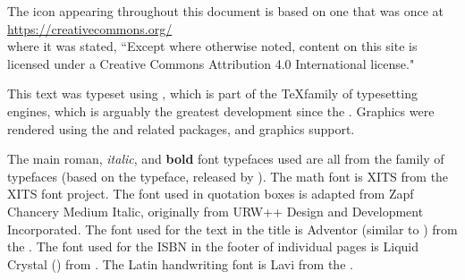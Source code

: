 The icon 
appearing throughout this document is based on one that was once at 
\\\indentx\url{https://creativecommons.org/}\\
where it was stated, 
``Except where otherwise noted, content on this site is licensed under a Creative Commons Attribution 4.0 International license."
\vfill
{\sffamily
This text was typeset using \hi{\XeLaTeX},
which is part of the \TeX family of typesetting engines, 
which is arguably the greatest development since the .
Graphics were rendered using the  and related packages, and \hi{\LaTeX} graphics support.

The main {\rmfamily roman}, {\itshape italic}, and {\bfseries bold} font typefaces used 
are all from the  family of typefaces
(based on the  typeface, released by ).
The math font is {{\fntXits XITS}} from the {{\fntXits XITS font project}}.
The font used in quotation boxes is adapted from {\fntZapf Zapf Chancery Medium Italic},
originally from URW++ Design and Development Incorporated.
The font used for the text in the title is {\fntAdventor Adventor} (similar to ) from the .
The font used for the ISBN in the footer of individual pages is 
\mbox{\fntDigital\footnotesize Liquid} \mbox{\fntDigital\footnotesize Crystal} 
() from .
The Latin handwriting font is {\fntLavi Lavi} from the .

}
